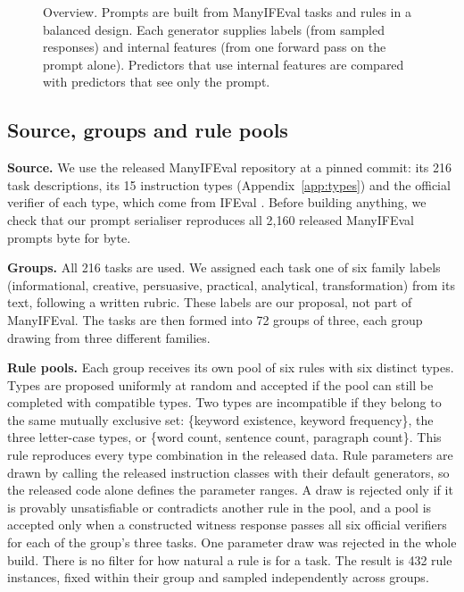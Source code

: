 \documentclass[10pt]{article}
\begin{document}
\begin{figure}[t]
\caption{Overview. Prompts are built from ManyIFEval tasks and rules in a balanced design. Each generator supplies
labels (from sampled responses) and internal features (from one forward pass on the prompt alone). Predictors that use
internal features are compared with predictors that see only the prompt.}
\label{fig:overview}
\end{figure}

\subsection{Source, groups and rule pools}

\textbf{Source.} We use the released ManyIFEval repository \citep{harada2025instructions} at a pinned commit: its 216
task descriptions, its 15 instruction types (Appendix~\ref{app:types}) and the official verifier of each type, which
come from IFEval \citep{zhou2023ifeval}. Before building anything, we check that our prompt serialiser reproduces all
2,160 released ManyIFEval prompts byte for byte.

\textbf{Groups.} All 216 tasks are used. We assigned each task one of six family labels (informational, creative,
persuasive, practical, analytical, transformation) from its text, following a written rubric. These labels are our
proposal, not part of ManyIFEval. The tasks are then formed into 72 groups of three, each group drawing from three
different families.

\textbf{Rule pools.} Each group receives its own pool of six rules with six distinct types. Types are proposed
uniformly at random and accepted if the pool can still be completed with compatible types. Two types are incompatible
if they belong to the same mutually exclusive set: \{keyword existence, keyword frequency\}, the three letter-case
types, or \{word count, sentence count, paragraph count\}. This rule reproduces every type combination in the released
data. Rule parameters are drawn by calling the released instruction classes with their default generators, so the
released code alone defines the parameter ranges. A draw is rejected only if it is provably unsatisfiable or
contradicts another rule in the pool, and a pool is accepted only when a constructed witness response passes all six
official verifiers for each of the group's three tasks. One parameter draw was rejected in the whole build. There is no
filter for how natural a rule is for a task. The result is 432 rule instances, fixed within their group and sampled
independently across groups.
\end{document}
